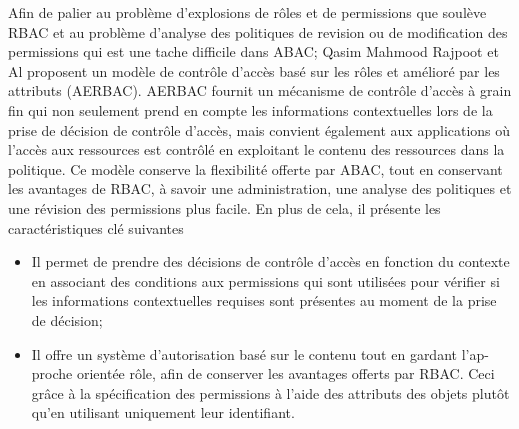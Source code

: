 Afin de palier au problème d'explosions de rôles et de permissions que soulève RBAC et au problème d'analyse des politiques de revision ou de modification des permissions qui est une tache difficile dans ABAC; Qasim Mahmood Rajpoot et Al \cite{rajpoot15} proposent un modèle de contrôle d'accès basé sur les rôles et amélioré par les attributs (AERBAC). AERBAC fournit un mécanisme de contrôle d'accès à grain fin qui non seulement prend en compte les informations contextuelles lors de la prise de décision de contrôle d'accès, mais convient également aux applications où l'accès aux ressources est contrôlé en exploitant le contenu des ressources dans la politique. Ce modèle conserve la flexibilité offerte par ABAC, tout en conservant les avantages de RBAC, à savoir une administration, une analyse des politiques et une révision des permissions plus facile. En plus de cela, il présente les caractéristiques clé suivantes
\begin{itemize}
\item Il permet de prendre des décisions de contrôle d'accès en fonction du contexte en associant des conditions aux permissions qui sont utilisées pour vérifier si les informations contextuelles requises sont présentes au moment de la prise de décision;
\item Il offre un système d'autorisation basé sur le contenu tout en gardant l'ap-proche orientée rôle, afin de conserver les avantages offerts par RBAC. Ceci grâce à la spécification des permissions à l'aide des attributs des objets plutôt qu'en utilisant uniquement leur identifiant.
\end{itemize}

